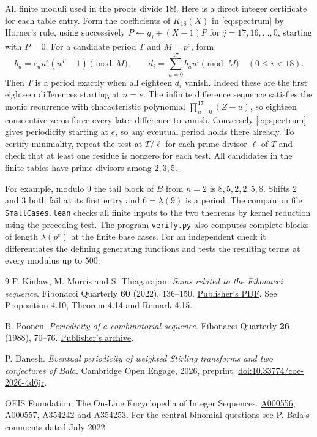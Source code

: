 \documentclass[11pt,letterpaper]{article}
\begin{document}
All finite moduli used in the proofs divide $18!$. Here is a direct
integer certificate for each table entry. Form the coefficients of
$K_{18}(X)$ in \eqref{eq:spectrum} by Horner's rule, using successively
$P\gets g_j+(X-1)P$ for $j=17,16,\ldots,0$, starting with $P=0$.
For a candidate period $T$ and $M=p^e$, form
\[
 b_u=c_u u^e(u^T-1)\pmod M,\qquad
 d_i=\sum_{u=0}^{17} b_u u^i\pmod M
 \quad(0\le i<18).
\]
Then $T$ is a period exactly when all eighteen $d_i$ vanish. Indeed these
are the first eighteen differences starting at $n=e$. The infinite
difference sequence satisfies the monic recurrence with characteristic
polynomial $\prod_{u=0}^{17}(Z-u)$, so eighteen consecutive zeros force
every later difference to vanish. Conversely \eqref{eq:spectrum} gives
periodicity starting at $e$, so any eventual period holds there already.
To certify minimality, repeat the test at $T/\ell$ for each prime divisor
$\ell$ of $T$ and check that at least one residue is nonzero for each test.
All candidates in the finite tables have prime divisors among $2,3,5$.

For example, modulo $9$ the tail block of $B$ from $n=2$ is
$8,5,2,2,5,8$. Shifts $2$ and $3$ both fail at its first entry and
$6=\lambda(9)$ is a period. The companion file \texttt{SmallCases.lean}
checks all finite inputs to the two theorems by kernel reduction using
the preceding test. The program \texttt{verify.py} also computes complete
blocks of length $\lambda(p^e)$ at the finite base cases. For an independent
check it differentiates the defining generating functions and tests the
resulting terms at every modulus up to $500$.

\begin{thebibliography}{9}
 P. Kinlaw, M. Morris and S. Thiagarajan.
\textit{Sums related to the Fibonacci sequence}.
Fibonacci Quarterly \textbf{60} (2022), 136--150.
\href{https://www.fq.math.ca/Papers/60-2/kinlaw03042021.pdf}{Publisher's PDF}.
See Proposition 4.10, Theorem 4.14 and Remark 4.15.

 B. Poonen. \textit{Periodicity of a combinatorial sequence}.
Fibonacci Quarterly \textbf{26} (1988), 70--76.
\href{https://www.mathstat.dal.ca/FQ/Scanned/26-1/poonen.pdf}{Publisher's archive}.

 P. Danesh. \textit{Eventual periodicity of weighted
Stirling transforms and two conjectures of Bala}. Cambridge Open Engage,
2026, preprint. \href{https://doi.org/10.33774/coe-2026-4d6jr}{doi:10.33774/coe-2026-4d6jr}.

 OEIS Foundation. The On-Line Encyclopedia of Integer Sequences.
\href{https://oeis.org/A000556}{A000556},
\href{https://oeis.org/A000557}{A000557},
\href{https://oeis.org/A354242}{A354242} and
\href{https://oeis.org/A354253}{A354253}.
For the central-binomial questions see P. Bala's comments dated July 2022.
\end{thebibliography}
\end{document}
